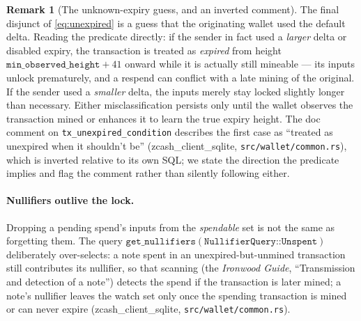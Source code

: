 \documentclass[11pt,a4paper]{article}
\theoremstyle{definition}
\newtheorem{remark}[theorem]{Remark}
\begin{document}
\begin{remark}[The unknown-expiry guess, and an inverted comment]
\label{rem:lifecycle-heuristic}
The final disjunct of \eqref{eq:unexpired} is a guess that the originating
wallet used the default delta. Reading the predicate directly: if the
sender in fact used a \emph{larger} delta or disabled expiry, the
transaction is treated as \emph{expired} from height
$\mathtt{min\_observed\_height} + 41$ onward while it is actually still
mineable --- its inputs unlock prematurely, and a respend can conflict with
a late mining of the original. If the sender used a \emph{smaller} delta,
the inputs merely stay locked slightly longer than necessary. Either
misclassification persists only until the wallet observes the transaction
mined or enhances it to learn the true expiry height. The doc comment on
\texttt{tx\_unexpired\_condition} describes the first case as ``treated as
unexpired when it shouldn't be''
(\textsf{zcash\_client\_sqlite}, \texttt{src/wallet/common.rs}), which is
inverted relative to its own SQL; we state the direction the predicate
implies and flag the comment rather than silently following either.
\end{remark}

\paragraph{Nullifiers outlive the lock.} Dropping a pending spend's inputs
from the \emph{spendable} set is not the same as forgetting them. The query
$\texttt{get\_nullifiers}(\texttt{NullifierQuery::Unspent})$ deliberately
over-selects: a note spent in an unexpired-but-unmined transaction still
contributes its nullifier, so that scanning (the \emph{Ironwood Guide},
``Transmission and detection of a note'') detects the spend if the
transaction is later mined; a note's nullifier leaves the watch set only
once the spending transaction is mined or can never expire
(\textsf{zcash\_client\_sqlite}, \texttt{src/wallet/common.rs}).
\end{document}
